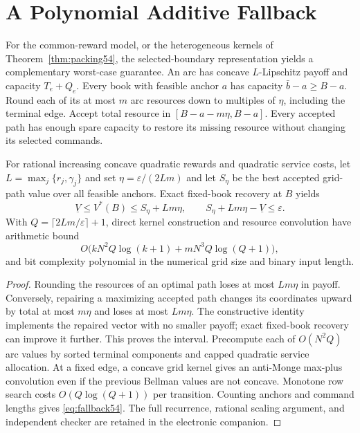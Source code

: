 \section{A Polynomial Additive Fallback}\label{sec:uniform54}
For the common-reward model, or the heterogeneous kernels of Theorem~\ref{thm:packing54}, the selected-boundary representation yields a complementary worst-case guarantee. An arc has concave $L$-Lipschitz payoff and capacity $T_e+Q_e$. Every book with feasible anchor $a$ has capacity $\bar b-a\geq B-a$. Round each of its at most $m$ arc resources down to multiples of $\eta$, including the terminal edge. Accept total resource in $[B-a-m\eta,B-a]$. Every accepted path has enough spare capacity to restore its missing resource without changing its selected commands.

\begin{theorem}\label{thm:uniform54}
For rational increasing concave quadratic rewards and quadratic service costs, let $L=\max_j\{r_j,\gamma_j\}$ and set $\eta=\varepsilon/(2Lm)$ and let $S_\eta$ be the best accepted grid-path value over all feasible anchors. Exact fixed-book recovery at $B$ yields
\[
 \underline V\leq V^*(B)\leq S_\eta+Lm\eta,
 \qquad S_\eta+Lm\eta-\underline V\leq\varepsilon.
\]
With $Q=\lceil2Lm/\varepsilon\rceil+1$, direct kernel construction and resource convolution have arithmetic bound
\begin{equation}\label{eq:fallback54}
 O\bigl(kN^2Q\log(k+1)+mN^3Q\log(Q+1)\bigr),
\end{equation}
and bit complexity polynomial in the numerical grid size and binary input length.
\end{theorem}
\begin{proof}
Rounding the resources of an optimal path loses at most $Lm\eta$ in payoff. Conversely, repairing a maximizing accepted path changes its coordinates upward by total at most $m\eta$ and loses at most $Lm\eta$. The constructive identity implements the repaired vector with no smaller payoff; exact fixed-book recovery can improve it further. This proves the interval. Precompute each of $O(N^2Q)$ arc values by sorted terminal components and capped quadratic service allocation. At a fixed edge, a concave grid kernel gives an anti-Monge max-plus convolution even if the previous Bellman values are not concave. Monotone row search costs $O(Q\log(Q+1))$ per transition. Counting anchors and command lengths gives \eqref{eq:fallback54}. The full recurrence, rational scaling argument, and independent checker are retained in the electronic companion.
\end{proof}
